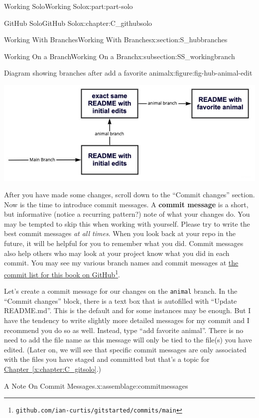 \documentclass[oneside,10pt,]{book}
\newcommand{\xreffont}{\relax}
\newcommand{\mono}[1]{\texttt{#1}}
\newcommand{\terminology}[1]{\textbf{#1}}
\begin{document}
\begin{partptx}{Working Solo}{}{Working Solo}{}{}{x:part:part-solo}
\begin{chapterptx}{GitHub Solo}{}{GitHub Solo}{}{}{x:chapter:C_githubsolo}
\begin{sectionptx}{Working With Branches}{}{Working With Branches}{}{}{x:section:S_hubbranches}
\begin{subsectionptx}{Working On a Branch}{}{Working On a Branch}{}{}{x:subsection:SS_workingbranch}
\begin{figureptx}{Diagram showing branches after add a favorite animal}{x:figure:fig-hub-animal-edit}{}
\begin{image}{0}{1}{0}%
\includegraphics[width=\linewidth]{external/hub_animal_edit.pdf}
\end{image}%
\tcblower
\end{figureptx}%
 After you have made some changes, scroll down to the ``Commit changes'' section. Now is the time to introduce commit messages. A \terminology{commit message} is a short, but informative (notice a recurring pattern?) note of what your changes do. You may be tempted to skip this when working with yourself. Please try to write the best commit messages \emph{at all times}. When you look back at your repo in the future, it will be helpful for you to remember what you did. Commit messages also help others who may look at your project know what you did in each commit. You may see my various branch names and commit messages at \href{https://github.com/ian-curtis/gitstarted/commits/main}{the commit list for this book on GitHub}\footnote{\nolinkurl{github.com/ian-curtis/gitstarted/commits/main}\label{g:fn:idm480174296}}.%
\par
Let's create a commit message for our changes on the \mono{animal} branch. In the ``Commit changes'' block, there is a text box that is autofilled with ``Update README.md''. This is the default and for some instances may be enough. But I have the tendency to write slightly more detailed messages for my commit and I recommend you do so as well. Instead, type ``add favorite animal''. There is no need to add the file name as this message will only be tied to the file(s) you have edited. (Later on, we will see that specific commit messages are only associated with the files you have staged and committed but that's a topic for \hyperref[x:chapter:C_gitsolo]{Chapter~{\xreffont\ref{x:chapter:C_gitsolo}}}.)%
\begin{assemblage}{A Note On Commit Messages.}{x:assemblage:commitmessages}%

\end{assemblage}
\end{subsectionptx}
\end{sectionptx}
\end{chapterptx}
\end{partptx}
\end{document}
